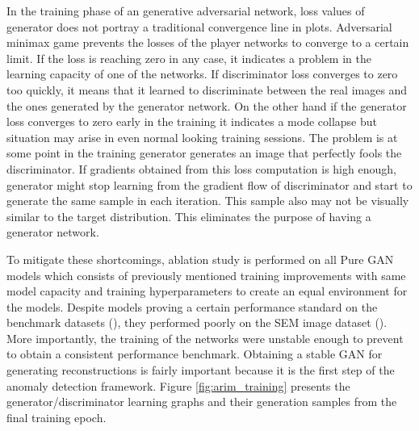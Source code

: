 In the training phase of an generative adversarial network, loss values of generator does not portray a traditional convergence line in plots.
Adversarial minimax game prevents the losses of the player networks to converge to a certain limit. If the loss is reaching zero in any case, it indicates 
a problem in the learning capacity of one of the networks. If discriminator loss converges to zero too quickly, it means that it learned to 
discriminate between the real images and the ones generated by the generator network. On the other hand if the generator loss converges to zero 
early in the training  it indicates a mode collapse but situation may arise in even normal looking training sessions. The problem is at some point in the training generator generates an image that perfectly fools the discriminator. If gradients obtained from this loss computation is high enough, generator might stop learning from the gradient flow of discriminator 
and start to generate the same sample in each iteration. This sample also may not be visually similar to the target distribution. This eliminates the 
purpose of having a generator network.

To mitigate these shortcomings, ablation study is performed on all Pure GAN models which consists of previously mentioned training 
improvements with same model capacity and training hyperparameters to create an equal environment for the models. Despite models 
proving a certain performance standard on the benchmark datasets (\cite{cifar10,Netzer2011ReadingDI}), they performed poorly on the SEM 
image dataset (\cite{sem}). More importantly, the training of the networks were unstable enough to prevent to obtain a consistent performance 
benchmark. Obtaining a stable GAN for generating reconstructions is fairly important because it is the first step of the anomaly 
detection framework. Figure \ref{fig:arim_training} presents the generator/discriminator learning graphs and their generation samples 
from the final training epoch.

